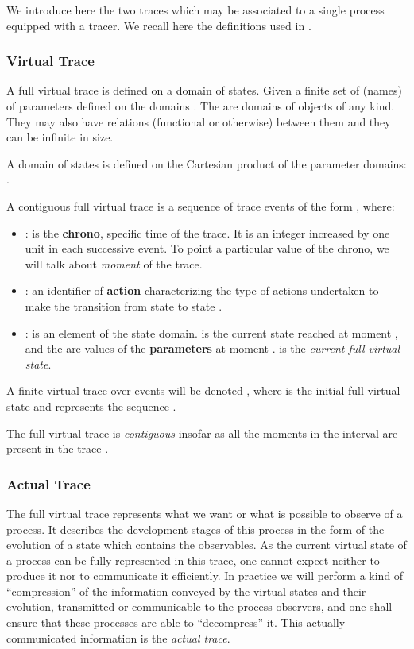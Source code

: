 We introduce here the two traces which may be associated to a single process equipped with a tracer. We recall here the definitions used in \cite{TMTmanuscript}.




\subsubsection{Virtual Trace}

A full virtual trace is defined on a domain of states. Given   a finite set of (names) of parameters   defined on the domains .
The  are domains of objects of any kind. They may also have relations (functional or otherwise) between them and they can be infinite in size.

A domain of states   is defined on the Cartesian product of the parameter domains: .


\begin{definition} 

A contiguous full virtual trace  is a sequence of trace events of the form {\bf }, where:
\begin{itemize}
  \item : is the {\bf chrono}, specific time of the trace. It is an integer increased by one unit in each successive event. To point a particular value of the chrono, we will talk about {\em moment} of the trace.
   \item : an identifier of {\bf action} characterizing the type of actions undertaken to make the transition from state  to state .
   \item : is an element of the state domain.  is the current state reached
at moment , and the  are values of the {\bf parameters}  at moment .
 is the {\em current full virtual state}.
\end{itemize}
\end{definition}
A finite virtual trace over  events will be denoted , where  is the initial full virtual state and  represents the sequence .



The full virtual trace is {\em contiguous} insofar as all the moments in the interval  are present in the trace .


\subsubsection{Actual Trace}

The full virtual trace represents what we want or what is possible to observe of a process. It describes the development stages of this process in the form of the evolution of a state which contains the observables. As the current virtual state of a process can be fully represented in this trace, one cannot expect neither to produce it nor to communicate it efficiently. In practice we will perform a kind of ``compression'' of the information conveyed by the virtual states and their evolution, transmitted or communicable to the process observers, and one shall ensure that these processes are able to ``decompress'' it. This actually communicated information is the {\em actual trace}.

